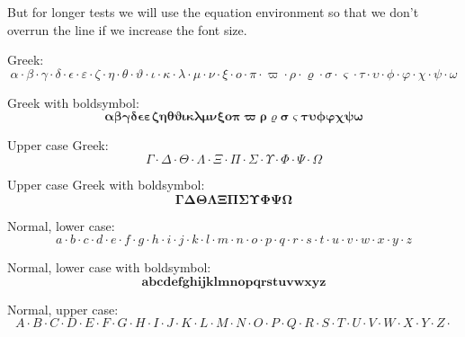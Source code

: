 \documentclass[12pt,a4paper]{article}
\theoremstyle{clearprint}
\begin{document}
\noindent 
But for longer tests we will use the equation environment so that we don't overrun the line if we increase the font size.

\noindent 
Greek:
\begin{equation}
\alpha \cdot \beta \cdot \gamma \cdot \delta \cdot \epsilon \cdot \varepsilon \cdot \zeta \cdot \eta \cdot \theta \cdot \vartheta \cdot \iota \cdot \kappa \cdot \lambda \cdot \mu \cdot \nu \cdot \xi \cdot o \cdot \pi \cdot \varpi \cdot \rho \cdot \varrho \cdot \sigma \cdot \varsigma \cdot \tau \cdot \upsilon \cdot \phi \cdot \varphi \cdot \chi \cdot \psi \cdot \omega
\end{equation}

\noindent 
Greek with boldsymbol:
\begin{equation}
\boldsymbol{\alpha  \beta  \gamma  \delta  \epsilon  \varepsilon  \zeta  \eta  \theta  \vartheta  \iota  \kappa  \lambda  \mu  \nu  \xi  o  \pi  \varpi  \rho  \varrho  \sigma  \varsigma  \tau  \upsilon  \phi  \varphi  \chi  \psi  \omega}
\end{equation}

\noindent 
Upper case Greek:
\begin{equation}
\Gamma \cdot \Delta \cdot \Theta \cdot \Lambda \cdot \Xi \cdot \Pi \cdot \Sigma \cdot \Upsilon \cdot \Phi \cdot \Psi \cdot \Omega
\end{equation}

\noindent 
Upper case Greek with boldsymbol:
\begin{equation}
\boldsymbol{\Gamma  \Delta  \Theta  \Lambda  \Xi  \Pi  \Sigma  \Upsilon  \Phi  \Psi  \Omega}
\end{equation}

\noindent 
Normal, lower case:
\begin{equation}
a \cdot b \cdot c \cdot d \cdot e \cdot f \cdot g \cdot h \cdot i \cdot j \cdot k \cdot l \cdot m \cdot n \cdot o \cdot p \cdot q \cdot r \cdot s \cdot t \cdot u \cdot v \cdot w \cdot x \cdot y \cdot z
\end{equation}

\noindent 
Normal, lower case with boldsymbol:
\begin{equation}
\boldsymbol{a  b  c  d  e  f  g  h  i  j  k  l  m  n  o  p  q  r  s  t  u  v  w  x  y  z}
\end{equation}

\noindent 
Normal, upper case:
\begin{equation}
A \cdot B \cdot C \cdot D \cdot E \cdot F \cdot G \cdot H \cdot I \cdot J \cdot K \cdot L \cdot M \cdot N \cdot O \cdot P \cdot Q \cdot R \cdot S \cdot T \cdot U \cdot V \cdot W \cdot X \cdot Y \cdot Z \cdot 
\end{equation}
\end{document}
